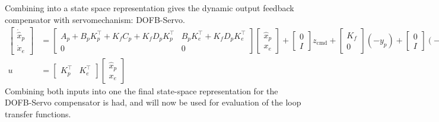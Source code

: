 Combining into a state space representation gives the dynamic output feedback compensator with servomechanism: DOFB-Servo.
\begin{align*}
  \begin{bmatrix}
    \dot{\hat{x}}_{p} \\
    \dot{x}_{e}
  \end{bmatrix}&=
  \begin{bmatrix}
    A_{p}+B_{p}K_{p}^{\top}+K_{f}C_{p}+K_{f}D_{p}K_{p}^{\top} & B_{p}K_{e}^{\top}+K_{f}D_{p}K_{e}^{\top} \\
    0 & 0
  \end{bmatrix}
  \begin{bmatrix}
    \hat{x}_{p} \\
    x_{e}
  \end{bmatrix}+
  \begin{bmatrix}
    0 \\
    I
  \end{bmatrix}z_{\text{cmd}}+
  \begin{bmatrix}
    K_{f} \\
    0
  \end{bmatrix}(-y_{p})+
  \begin{bmatrix}
    0 \\
    I
  \end{bmatrix}(-z) \\
  u&=
  \left[
    \begin{array}{cc}
      K_{p}^{\top} & K_{e}^{\top}
    \end{array}
  \right]
  \left[
    \begin{array}{c}
      \hat{x}_{p} \\
      x_{e}
    \end{array}
  \right]
\end{align*}
Combining both inputs into one the final state-space representation for the DOFB-Servo compensator is had, and will now be used for evaluation of the loop transfer functions.


